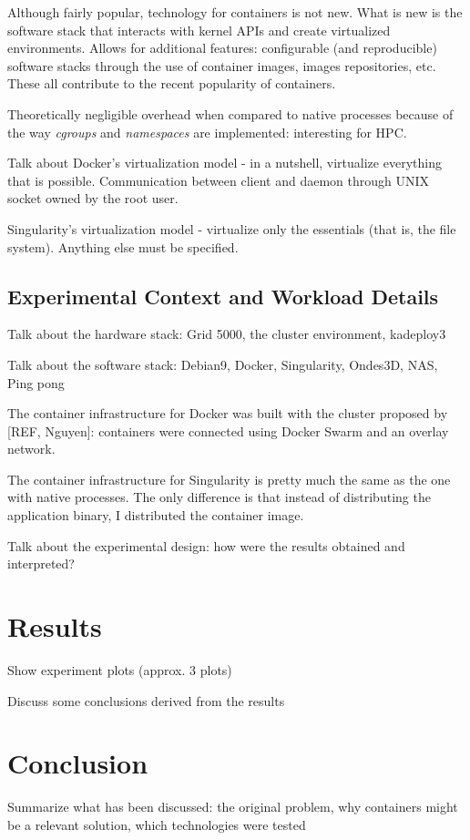 \documentclass[12pt]{article}
\begin{document}
Although fairly popular, technology for containers is not new. What is new is the software stack that interacts with kernel APIs and create virtualized environments. Allows for additional features: configurable (and reproducible) software stacks through the use of container images, images repositories, etc. These all contribute to the recent popularity of containers.

Theoretically negligible overhead when compared to native processes because of the way \textit{cgroups} and \textit{namespaces} are implemented: interesting for HPC.

Talk about Docker's virtualization model - in a nutshell, virtualize everything that is possible. Communication between client and daemon through UNIX socket owned by the root user.

Singularity's virtualization model - virtualize only the essentials (that is, the file system). Anything else must be specified.

\subsection{Experimental Context and Workload Details}
Talk about the hardware stack: Grid 5000, the cluster environment, kadeploy3

Talk about the software stack: Debian9, Docker, Singularity, Ondes3D, NAS, Ping pong

The container infrastructure for Docker was built with the cluster proposed by [REF, Nguyen]: containers were connected using Docker Swarm and an overlay network.

The container infrastructure for Singularity is pretty much the same as the one with native processes. The only difference is that instead of distributing the application binary, I distributed the container image.

Talk about the experimental design: how were the results obtained and interpreted?

\section{Results}
Show experiment plots (approx. 3 plots)

Discuss some conclusions derived from the results

\section{Conclusion}
Summarize what has been discussed: the original problem, why containers might be a relevant solution, which technologies were tested
\end{document}
